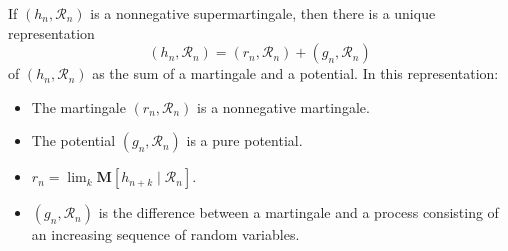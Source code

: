 If $(h_n, \mathcal{R}_n)$ is a nonnegative supermartingale, then there is a unique representation
$$(h_n, \mathcal{R}_n) = (r_n, \mathcal{R}_n) + (g_n, \mathcal{R}_n)$$
of $(h_n, \mathcal{R}_n)$ as the sum of a martingale and a potential. In this representation:
\begin{itemize}
\item The martingale $(r_n, \mathcal{R}_n)$ is a nonnegative martingale.
\item The potential $(g_n, \mathcal{R}_n)$ is a pure potential.
\item $r_n = \lim_k \mathbf{M}[h_{n+k} \mid \mathcal{R}_n]$.
\item $(g_n, \mathcal{R}_n)$ is the difference between a martingale and a process consisting of an increasing sequence of random variables.
\end{itemize}
